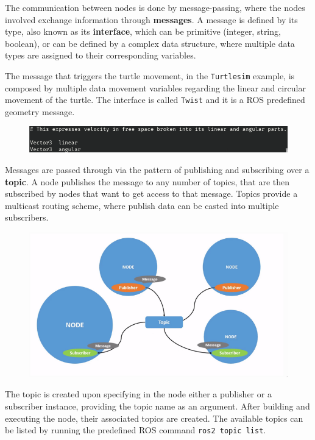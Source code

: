 The communication between nodes is done by message-passing, where the nodes involved exchange information through \textbf{messages}. A message is defined by its type, also known as its \textbf{interface}, which can be primitive (integer, string, boolean), or can be defined by a complex data structure, where multiple data types are assigned to their corresponding variables.

The message that triggers the turtle movement, in the \texttt{Turtlesim} example, is composed by multiple data movement variables regarding the linear and circular movement of the turtle. The interface is called \texttt{Twist} and it is a ROS predefined geometry message.

\begin{figure}[H]
        \centering
         \includegraphics[width=0.7\linewidth]{images/ts_interface_twist.png}
\end{figure}
            
Messages are passed through via the pattern of publishing and subscribing over a \textbf{topic}. A node publishes the message to any number of topics, that are then subscribed by nodes that want to get access to that message. Topics provide a multicast routing scheme, where publish data can be casted into multiple subscribers.

\begin{figure}[H]
        \centering
        \includegraphics[width=0.7\linewidth]{images/ros2-topics.png}
\end{figure}
            
The topic is created upon specifying in the node either a publisher or a subscriber instance, providing the topic name as an argument. After building and executing the node, their associated topics are created. The available topics can be listed by running the predefined ROS command \texttt{ros2 topic list}.
            
